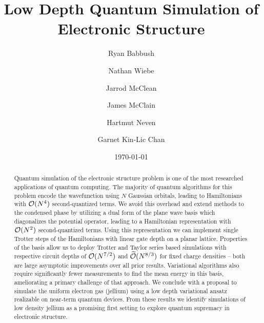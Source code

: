 \documentclass[superscriptaddress,aps,pra,nofootinbib,notitlepage,10pt,longbibliography]{revtex4-1}
\begin{document}
\title{Low Depth Quantum Simulation of Electronic Structure}

\date{\today}
\author{Ryan Babbush}
\author{Nathan Wiebe}
\author{Jarrod McClean}
\author{James McClain}
\author{Hartmut Neven}
\author{Garnet Kin-Lic Chan}


\begin{abstract}
Quantum simulation of the electronic structure problem is one of the most researched applications of quantum computing. The majority of quantum algorithms for this problem encode the wavefunction using $N$ Gaussian orbitals, leading to Hamiltonians with ${\cal O}(N^4)$ second-quantized terms. We avoid this overhead and extend methods to the condensed phase by utilizing a dual form of the plane wave basis which diagonalizes the potential operator, leading to a Hamiltonian representation with ${\cal O}(N^2)$ second-quantized terms. Using this representation we can implement single Trotter steps of the Hamiltonians with linear gate depth on a planar lattice. Properties of the basis allow us to deploy Trotter and Taylor series based simulations with respective circuit depths of ${\cal O}(N^{7/2})$ and $\widetilde{\cal O}(N^{8/3})$ for fixed charge densities -- both are large asymptotic improvements over all prior results. Variational algorithms also require significantly fewer measurements to find the mean energy in this basis, ameliorating a primary challenge of that approach. We conclude with a proposal to simulate the uniform electron gas (jellium) using a low depth variational ansatz realizable on near-term quantum devices. From these results we identify simulations of low density jellium as a promising first setting to explore quantum supremacy in electronic structure.
\end{abstract}
\maketitle
\end{document}
